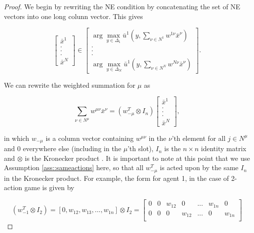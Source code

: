 \documentclass{article}
\theoremstyle{definition}
\begin{document}
  \begin{proof}
    We begin by rewriting the NE condition by concatenating the set of NE vectors into one long colunn vector. This gives

    \begin{equation}
      \begin{bmatrix}
        \bar{x}^1 \\ . \\ . \\ . \\ \bar{x}^N
      \end{bmatrix} \in
      \begin{bmatrix}
      \arg\max_{y \in \Delta_1} \bar{u}^1(y, \sum_{\nu \in N^1} w^{1 \nu} \bar{x}^\nu) \\ . \\ . \\ . \\ \arg\max_{y \in \Delta_N} \bar{u}^1(y, \sum_{\nu \in N^N} w^{N \nu} \bar{x}^\nu)
      \end{bmatrix} .
    \end{equation}

    We can rewrite the weighted summation for $\mu$ as

    \begin{equation}
      \sum_{\nu \in N^\mu} w^{\mu \nu} \bar{x}^\nu = (w_{-\mu}^T \otimes I_n) \begin{bmatrix}
        \bar{x}^1 \\ . \\ . \\ . \\ \bar{x}^N
      \end{bmatrix},
    \end{equation}
  
    in which $w_{-\mu}$ is a column vector containing $w^{\mu \nu}$ in the $\nu$'th element for all $j \in N^\mu$ and 0 everywhere else (including in the $\mu$'th slot), $I_n$ is the $n \times n$ identity matrix and $\otimes$ is the Kronecker product \cite{Findforthis}. It is important to note at this point that we use Assumption \ref{ass::sameactions} here, so that all $w_{-\mu}^T$ is acted upon by the same $I_n$ in the Kronecker product. For example, the form for agent 1, in the case of 2-action game is given by

    \begin{equation}
      (w_{-1}^T \otimes I_2) = [0, w_{12}, w_{13}, ..., w_{1n}] \otimes I_2 = 
      \begin{bmatrix}
        0 & 0 & w_{12} & 0 & ... & w_{1n} & 0 \\
        0 & 0 & 0 & w_{12} & ... & 0 & w_{1n} \\
      \end{bmatrix}
    \end{equation}
    

\end{proof}
\end{document}
